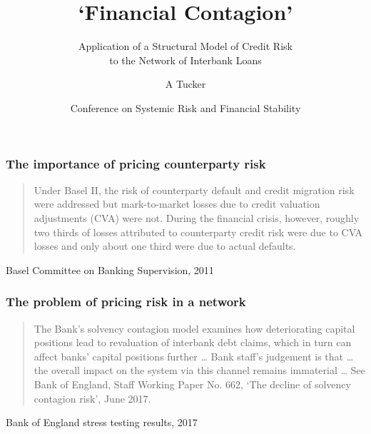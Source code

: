 \documentclass{beamer}
\title[Pricing Interbank Debt]
{`Financial Contagion'}
\subtitle {Application of a Structural Model of Credit Risk\\
  to the Network of Interbank Loans}
\author {A Tucker} %
\institute%
{SYSRISK}
\date
{Conference on Systemic Risk and Financial Stability}
\begin{document}
\begin{frame}[plain, label=titlepage]
  \titlepage
\end{frame}




\begin{frame}[label=baselquote]
  \frametitle{The importance of pricing counterparty risk}
  \begin{quotation}
    Under Basel II, the risk of counterparty default and credit migration risk were addressed but mark-to-market losses due to credit valuation adjustments (CVA) were not. During the financial crisis, however, roughly two thirds of losses attributed to counterparty credit risk were due to CVA losses and only about one third were due to actual defaults.
  \end{quotation}
  \begin{flushright}
    Basel Committee on Banking Supervision, 2011
  \end{flushright}
\end{frame}

\begin{frame}[label=boequote]
  \frametitle{The problem of pricing risk in a network}
  \begin{quotation}
    The Bank's \alert{solvency contagion model} examines how deteriorating
    capital positions lead to revaluation of interbank debt claims,
    which in turn can affect banks' capital positions further \dots
    Bank staff's judgement is that \dots the overall impact on the system
    via this channel remains immaterial \dots
    See Bank of England, Staff Working Paper No. 662,
    `The decline of solvency contagion risk', June 2017.
  \end{quotation}
  \begin{flushright}
    Bank of England stress testing results, 2017
  \end{flushright}
\end{frame}
\end{document}
